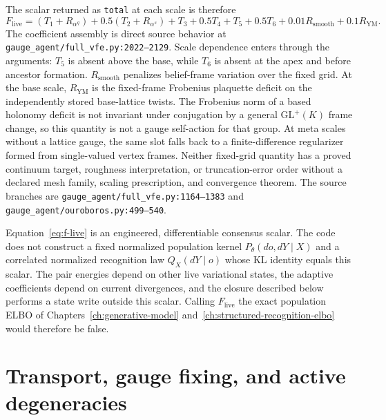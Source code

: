 The scalar returned as \texttt{total} at each scale is therefore
\begin{equation}
 \boxed{
 F_{\mathrm{live}}
 =(T_1+R_{\alpha^q})+0.5(T_2+R_{\alpha^s})+T_3+0.5T_4+T_5
 +0.5T_6+0.01R_{\mathrm{smooth}}+0.1R_{\mathrm{YM}}.}
 \label{eq:f-live}
\end{equation}
The coefficient assembly is direct source behavior at \texttt{gauge\_agent/full\_vfe.py:2022--2129}. Scale dependence enters through the arguments: $T_5$ is absent above the base, while $T_6$ is absent at the apex and before ancestor formation. $R_{\mathrm{smooth}}$ penalizes belief-frame variation over the fixed grid. At the base scale, $R_{\mathrm{YM}}$ is the fixed-frame Frobenius plaquette deficit on the independently stored base-lattice twists. The Frobenius norm of a based holonomy deficit is not invariant under conjugation by a general $\mathrm{GL}^{+}(K)$ frame change, so this quantity is not a gauge self-action for that group. At meta scales without a lattice gauge, the same slot falls back to a finite-difference regularizer formed from single-valued vertex frames. Neither fixed-grid quantity has a proved continuum target, roughness interpretation, or truncation-error order without a declared mesh family, scaling prescription, and convergence theorem. The source branches are \texttt{gauge\_agent/full\_vfe.py:1164--1383} and \texttt{gauge\_agent/ouroboros.py:499--540}.

Equation~\eqref{eq:f-live} is an engineered, differentiable consensus scalar. The code does not construct a fixed normalized population kernel $P_\theta(do,dY\mid X)$ and a correlated normalized recognition law $Q_X(dY\mid o)$ whose KL identity equals this scalar. The pair energies depend on other live variational states, the adaptive coefficients depend on current divergences, and the closure described below performs a state write outside this scalar. Calling $F_{\mathrm{live}}$ the exact population ELBO of Chapters~\ref{ch:generative-model} and~\ref{ch:structured-recognition-elbo} would therefore be false.

\section{Transport, gauge fixing, and active degeneracies}

